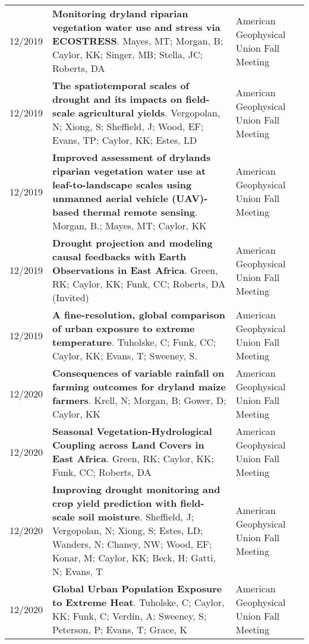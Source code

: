 \begin{longtable}{lp{10.0cm}p{4.5cm}}
12/2019 & {\bf Monitoring dryland riparian vegetation water use and stress via ECOSTRESS}. Mayes, MT; Morgan, B; Caylor, KK; Singer, MB; Stella, JC; Roberts, DA  & American Geophysical Union Fall Meeting \\
  
12/2019 & {\bf The spatiotemporal scales of drought and its impacts on field-scale agricultural yields}. Vergopolan, N; Xiong, S; Sheffield, J; Wood, EF; Evans, TP; Caylor, KK; Estes, LD  & American Geophysical Union Fall Meeting \\
  
12/2019 & {\bf Improved assessment of drylands riparian vegetation water use at leaf-to-landscape scales using unmanned aerial vehicle (UAV)-based thermal remote sensing}. Morgan, B.; Mayes, MT; Caylor, KK  & American Geophysical Union Fall Meeting \\
  
12/2019 & {\bf Drought projection and modeling causal feedbacks with Earth Observations in East Africa}. Green, RK; Caylor, KK; Funk, CC; Roberts, DA  (Invited)  & American Geophysical Union Fall Meeting \\
  
12/2019 & {\bf A fine-resolution, global comparison of urban exposure to extreme temperature}. Tuholske, C; Funk, CC; Caylor, KK; Evans, T; Sweeney, S.  & American Geophysical Union Fall Meeting \\
  
12/2020 & {\bf Consequences of variable rainfall on farming outcomes for dryland maize farmers}. Krell, N; Morgan, B; Gower, D; Caylor, KK  & American Geophysical Union Fall Meeting \\
  
12/2020 & {\bf Seasonal Vegetation-Hydrological Coupling across Land Covers in East Africa}. Green, RK; Caylor, KK; Funk, CC; Roberts, DA  & American Geophysical Union Fall Meeting \\
  
12/2020 & {\bf Improving drought monitoring and crop yield prediction with field-scale soil moisture}. Sheffield, J; Vergopolan, N; Xiong, S; Estes, LD; Wanders, N; Chaney, NW; Wood, EF; Konar, M; Caylor, KK; Beck, H; Gatti, N; Evans, T  & American Geophysical Union Fall Meeting \\
  
12/2020 & {\bf Global Urban Population Exposure to Extreme Heat}. Tuholske, C; Caylor, KK; Funk, C; Verdin, A; Sweeney, S; Peterson, P; Evans, T; Grace, K  & American Geophysical Union Fall Meeting \\
  

\end{longtable}
